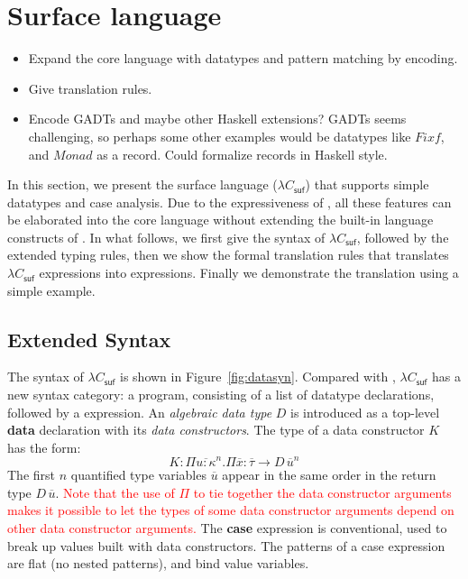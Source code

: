 \section{Surface language}
\label{sec:surface}


\begin{itemize}
\item Expand the core language with datatypes and pattern matching by encoding.
\item Give translation rules.
\item Encode GADTs and maybe other Haskell extensions? GADTs seems challenging, so perhaps some other examples would be datatypes like $Fix f$, and $Monad$ as a record. Could formalize records in Haskell style.
\end{itemize}

\newcommand{\sufcc}{$\lambda C_{\mathsf{suf}}$\xspace}

In this section, we present the surface language (\sufcc) that supports simple datatypes and case analysis. Due to the expressiveness of \name, all these features can be elaborated into the core language without extending the built-in language constructs of \name. In what follows, we first give the syntax of \sufcc, followed by the extended typing rules, then we show the formal translation rules that translates \sufcc expressions into \name expressions. Finally we demonstrate the translation using a simple example.

\subsection{Extended Syntax}

The syntax of \sufcc is shown in Figure~\ref{fig:datasyn}. Compared with \name, \sufcc has a new syntax category: a program, consisting of a list of datatype declarations, followed by a expression. An \emph{algebraic data type} $D$ is introduced as a top-level \textbf{data} declaration with its \emph{data constructors}. The type of a data constructor $K$ has the form: \[K : \Pi\overline{u : \kappa}^{n}.\Pi\overline{x}:\overline{\tau} \rightarrow D\,\overline{u}^{n} \] The first $n$ quantified type variables $\overline{u}$ appear in the same order in the return type $D\,\overline{u}$. \textcolor{red}{Note that the use of $\Pi$ to tie together the data constructor arguments makes it possible to let the types of some data constructor arguments depend on other data constructor arguments.} The \textbf{case} expression is conventional, used to break up values built with data constructors. The patterns of a case expression are flat (no nested patterns), and bind value variables.

